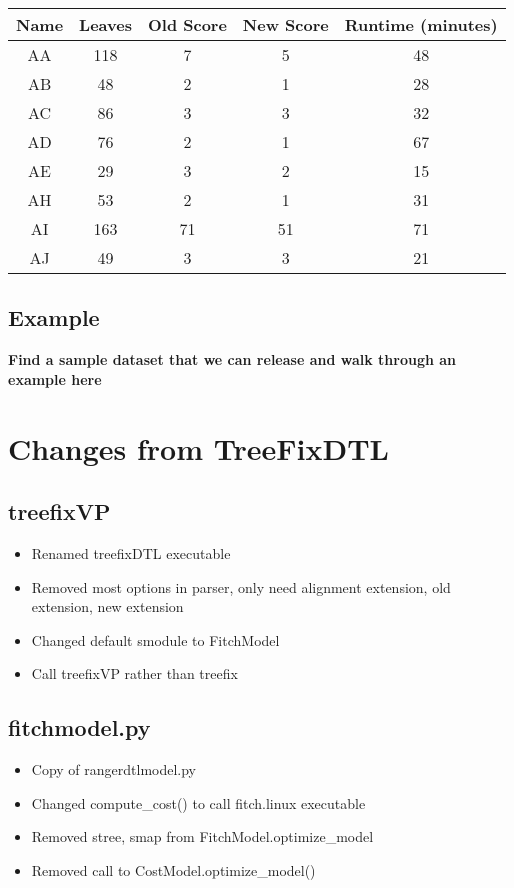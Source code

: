 \documentclass[12pt]{article}
\begin{document}
\vspace{5mm}
\begin{tabular}{ |c|c|c|c|c| }
    \hline
    \textbf{Name} & \textbf{Leaves} & \textbf{Old Score} & \textbf{New Score} & \textbf{Runtime (minutes)} \\
    \hline
    AA & 118 & 7 & 5 & 48 \\
    \hline
    AB & 48 & 2 & 1 & 28 \\
    \hline
    AC & 86 & 3 & 3 & 32 \\
    \hline
    AD & 76 & 2 & 1 & 67 \\
    \hline
    AE & 29 & 3 & 2 & 15 \\
    \hline
    AH & 53 & 2 & 1 & 31 \\
    \hline
    AI & 163 & 71 & 51 & 71 \\
    \hline
    AJ & 49 & 3 & 3 & 21 \\
    \hline
\end{tabular}

\subsection{Example}
\textbf{Find a sample dataset that we can release and walk through
an example here}

\section{Changes from TreeFixDTL}

\subsection{treefixVP}
\begin{itemize}
    \item Renamed treefixDTL executable
    \item Removed most options in parser, only need alignment extension, old extension, new extension
    \item Changed default smodule to FitchModel
    \item Call treefixVP rather than treefix
\end{itemize}

\subsection{fitchmodel.py}
\begin{itemize}
    \item Copy of rangerdtlmodel.py
    \item Changed compute{\_}cost() to call fitch.linux executable
    \item Removed stree, smap from FitchModel.optimize{\_}model
    \item Removed call to CostModel.optimize{\_}model()
\end{itemize}
\end{document}
